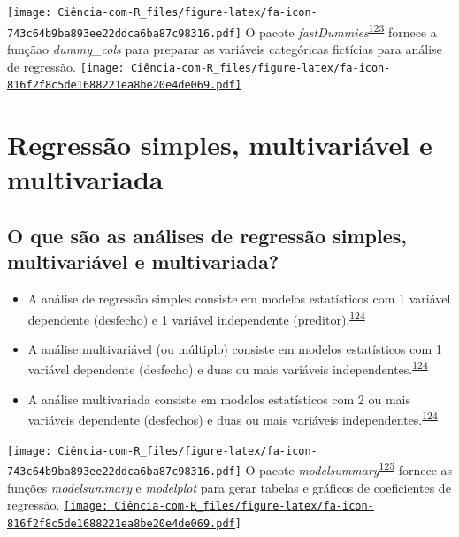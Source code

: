 \documentclass[
]{book}
\begin{document}
\texttt{[image: Ciência-com-R\_files/figure-latex/fa-icon-743c64b9ba893ee22ddca6ba87c98316.pdf]} O pacote \emph{fastDummies}\textsuperscript{\protect\hyperlink{ref-fastDummies}{123}} fornece a funçãao \emph{dummy\_cols} para preparar as variáveis categóricas fictícias para análise de regressão. \href{https://cran.r-project.org/web/packages/fastDummies/index.html}{\texttt{[image: Ciência-com-R\_files/figure-latex/fa-icon-816f2f8c5de1688221ea8be20e4de069.pdf]}}

\hypertarget{multivariavel-multivariada}{%
\section{Regressão simples, multivariável e multivariada}\label{multivariavel-multivariada}}

\hypertarget{o-que-suxe3o-as-anuxe1lises-de-regressuxe3o-simples-multivariuxe1vel-e-multivariada}{%
\subsection{O que são as análises de regressão simples, multivariável e multivariada?}\label{o-que-suxe3o-as-anuxe1lises-de-regressuxe3o-simples-multivariuxe1vel-e-multivariada}}

\begin{itemize}
\item
  A análise de regressão simples consiste em modelos estatísticos com 1 variável dependente (desfecho) e 1 variável independente (preditor).\textsuperscript{\protect\hyperlink{ref-Hidalgo2013}{124}}
\item
  A análise multivariável (ou múltiplo) consiste em modelos estatísticos com 1 variável dependente (desfecho) e duas ou mais variáveis independentes.\textsuperscript{\protect\hyperlink{ref-Hidalgo2013}{124}}
\item
  A análise multivariada consiste em modelos estatísticos com 2 ou mais variáveis dependente (desfechos) e duas ou mais variáveis independentes.\textsuperscript{\protect\hyperlink{ref-Hidalgo2013}{124}}
\end{itemize}

\texttt{[image: Ciência-com-R\_files/figure-latex/fa-icon-743c64b9ba893ee22ddca6ba87c98316.pdf]} O pacote \emph{modelsummary}\textsuperscript{\protect\hyperlink{ref-modelsummary}{125}} fornece as funções \emph{modelsummary} e \emph{modelplot} para gerar tabelas e gráficos de coeficientes de regressão. \href{https://cloud.r-project.org/web/packages/modelsummary/index.html}{\texttt{[image: Ciência-com-R\_files/figure-latex/fa-icon-816f2f8c5de1688221ea8be20e4de069.pdf]}}
\end{document}
